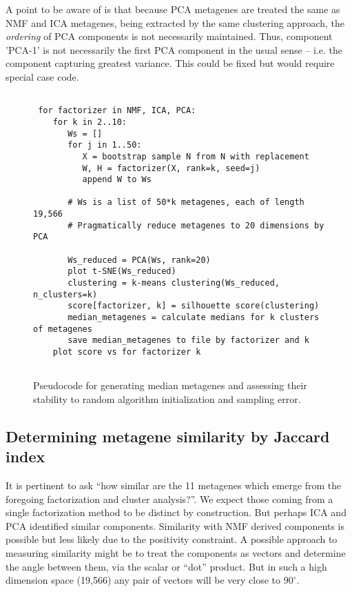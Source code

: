 \documentclass[tikz, 11pt,a4paper,oneside,fleqn]{article}
\begin{document}
A point to be aware of is that because PCA metagenes are treated the same as NMF and ICA metagenes, being extracted by the same clustering approach, the \emph{ordering} of PCA components is not necessarily maintained.   Thus, component 'PCA-1' is not necessarily the first PCA component  in the usual sense -- i.e. the component capturing greatest variance.  This could be fixed but would require special case code.

\begin{figure}[htb!]
\begin{center}
\begin{Verbatim}[baselinestretch=1, frame=single, rulecolor=\color{blue}, label=Metagene Stability Assessment, fontfamily=courier, fontsize=\small]

 for factorizer in NMF, ICA, PCA:
    for k in 2..10:
       Ws = []
       for j in 1..50:
          X = bootstrap sample N from N with replacement
          W, H = factorizer(X, rank=k, seed=j)
          append W to Ws
   	     
       # Ws is a list of 50*k metagenes, each of length 19,566
       # Pragmatically reduce metagenes to 20 dimensions by PCA
   	  
       Ws_reduced = PCA(Ws, rank=20)
       plot t-SNE(Ws_reduced)
       clustering = k-means clustering(Ws_reduced, n_clusters=k)
       score[factorizer, k] = silhouette score(clustering)	  
       median_metagenes = calculate medians for k clusters of metagenes
       save median_metagenes to file by factorizer and k
    plot score vs for factorizer k
      
\end{Verbatim}
\end{center}
\caption{Pseudocode for generating median metagenes and assessing their stability to random algorithm initialization and sampling error.}
\label{fig-clustering-psuedocode}
\end{figure}

\subsection{Determining metagene similarity by Jaccard index}

It is pertinent to ask ``how similar are the 11 metagenes which emerge from the foregoing factorization and cluster analysis?''.  We expect those coming from a single factorization method to be distinct by construction.  But perhaps ICA and PCA identified similar components.  Similarity with NMF derived components is possible but less likely due to the positivity constraint.  A possible approach to measuring similarity might be to treat the components as vectors and determine the angle between them, via the scalar or ``dot'' product.  But in such a high dimension space (19,566) any pair of vectors will be very close to $90^\circ$.
\end{document}
